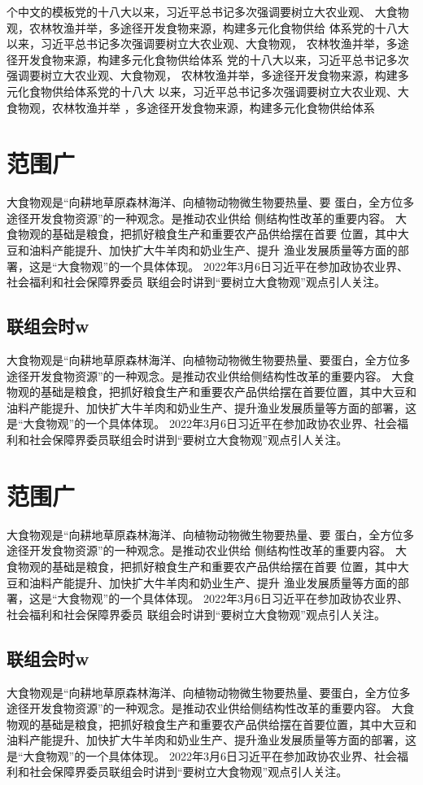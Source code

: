 
个中文的模板党的十八大以来，习近平总书记多次强调要树立大农业观、
大食物观，农林牧渔并举，多途径开发食物来源，构建多元化食物供给
体系党的十八大以来，习近平总书记多次强调要树立大农业观、大食物观，
农林牧渔并举，多途径开发食物来源，构建多元化食物供给体系
党的十八大以来，习近平总书记多次强调要树立大农业观、大食物观，
农林牧渔并举，多途径开发食物来源，构建多元化食物供给体系党的十八大
以来，习近平总书记多次强调要树立大农业观、大食物观，农林牧渔并举
，多途径开发食物来源，构建多元化食物供给体系
	\section{范围广}
	大食物观是“向耕地草原森林海洋、向植物动物微生物要热量、要
	蛋白，全方位多途径开发食物资源”的一种观念。是推动农业供给
	侧结构性改革的重要内容。
大食物观的基础是粮食，把抓好粮食生产和重要农产品供给摆在首要
位置，其中大豆和油料产能提升、加快扩大牛羊肉和奶业生产、提升
渔业发展质量等方面的部署，这是“大食物观”的一个具体体现。
2022年3月6日习近平在参加政协农业界、社会福利和社会保障界委员
联组会时讲到“要树立大食物观”观点引人关注。
\subsection{联组会时w}
大食物观是“向耕地草原森林海洋、向植物动物微生物要热量、要蛋白，全方位多途径开发食物资源”的一种观念。是推动农业供给侧结构性改革的重要内容。
大食物观的基础是粮食，把抓好粮食生产和重要农产品供给摆在首要位置，其中大豆和油料产能提升、加快扩大牛羊肉和奶业生产、提升渔业发展质量等方面的部署，这是“大食物观”的一个具体体现。
2022年3月6日习近平在参加政协农业界、社会福利和社会保障界委员联组会时讲到“要树立大食物观”观点引人关注。
\section{范围广}
大食物观是“向耕地草原森林海洋、向植物动物微生物要热量、要
蛋白，全方位多途径开发食物资源”的一种观念。是推动农业供给
侧结构性改革的重要内容。
大食物观的基础是粮食，把抓好粮食生产和重要农产品供给摆在首要
位置，其中大豆和油料产能提升、加快扩大牛羊肉和奶业生产、提升
渔业发展质量等方面的部署，这是“大食物观”的一个具体体现。
2022年3月6日习近平在参加政协农业界、社会福利和社会保障界委员
联组会时讲到“要树立大食物观”观点引人关注。
\subsection{联组会时w}
大食物观是“向耕地草原森林海洋、向植物动物微生物要热量、要蛋白，全方位多途径开发食物资源”的一种观念。是推动农业供给侧结构性改革的重要内容。
大食物观的基础是粮食，把抓好粮食生产和重要农产品供给摆在首要位置，其中大豆和油料产能提升、加快扩大牛羊肉和奶业生产、提升渔业发展质量等方面的部署，这是“大食物观”的一个具体体现。
2022年3月6日习近平在参加政协农业界、社会福利和社会保障界委员联组会时讲到“要树立大食物观”观点引人关注。






